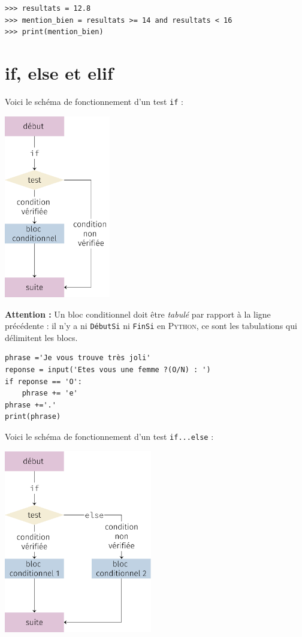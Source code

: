 \begin{pys}
	\begin{verbatim}
>>> resultats = 12.8
>>> mention_bien = resultats >= 14 and resultats < 16
>>> print(mention_bien)
    \end{verbatim}
\end{pys}

\section{if, else et elif}
Voici le schéma de fonctionnement d'un test \texttt{if} :
\begin{center}
	\includegraphics[height=8cm]{ch-conditions/img/if}
\end{center}

\textbf{Attention :} Un bloc conditionnel doit être \textit{tabulé} par rapport à la ligne précédente : il n'y a ni \texttt{DébutSi}  ni \texttt{FinSi}
en \textsc{Python}, ce sont les tabulations qui délimitent les blocs.

\begin{pyc}
	\begin{verbatim}
phrase ='Je vous trouve très joli'
reponse = input('Etes vous une femme ?(O/N) : ')
if reponse == 'O':
    phrase += 'e'
phrase +='.'
print(phrase)
\end{verbatim}
\end{pyc}

Voici le schéma de fonctionnement d'un test \texttt{if...else} :
\begin{center}
	\includegraphics[height=8cm]{ch-conditions/img/ifelse}
\end{center}

